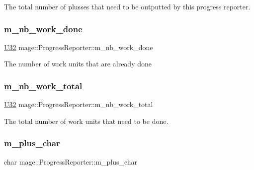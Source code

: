 The total number of plusses that need to be outputted by this progress reporter. \hypertarget{classmage_1_1_progress_reporter_a94bdbb09ae95976c72f1a8387ff96b70}{}\label{classmage_1_1_progress_reporter_a94bdbb09ae95976c72f1a8387ff96b70} 
\subsubsection{\texorpdfstring{m\+\_\+nb\+\_\+work\+\_\+done}{m\_nb\_work\_done}}
{\footnotesize\ttfamily \hyperlink{namespacemage_a41c104c036fba3756a74e19f793eeaa1}{U32} mage\+::\+Progress\+Reporter\+::m\+\_\+nb\+\_\+work\+\_\+done\hspace{0.3cm}{\ttfamily [private]}}

The number of work units that are already done \hypertarget{classmage_1_1_progress_reporter_a5f3e7dd9faa3d247bd6dd3738aeb7120}{}\label{classmage_1_1_progress_reporter_a5f3e7dd9faa3d247bd6dd3738aeb7120} 
\subsubsection{\texorpdfstring{m\+\_\+nb\+\_\+work\+\_\+total}{m\_nb\_work\_total}}
{\footnotesize\ttfamily \hyperlink{namespacemage_a41c104c036fba3756a74e19f793eeaa1}{U32} mage\+::\+Progress\+Reporter\+::m\+\_\+nb\+\_\+work\+\_\+total\hspace{0.3cm}{\ttfamily [private]}}

The total number of work units that need to be done. \hypertarget{classmage_1_1_progress_reporter_a00f36d331ba2b621855c545fcb92d948}{}\label{classmage_1_1_progress_reporter_a00f36d331ba2b621855c545fcb92d948} 
\subsubsection{\texorpdfstring{m\+\_\+plus\+\_\+char}{m\_plus\_char}}
{\footnotesize\ttfamily char mage\+::\+Progress\+Reporter\+::m\+\_\+plus\+\_\+char\hspace{0.3cm}{\ttfamily [private]}}

